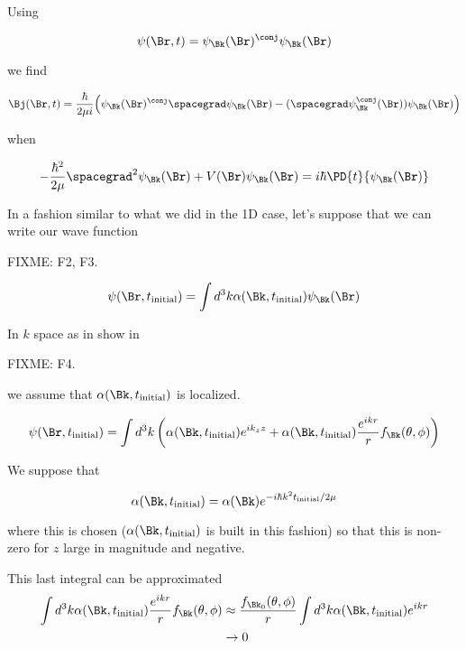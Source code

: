 Using

\begin{equation}\label{eqn:qmTwoL24:n}
\psi(\Br, t) =
\psi_\Bk(\Br)^\conj
\psi_\Bk(\Br)
\end{equation}

we find

\begin{equation}\label{eqn:qmTwoL24:n}
\Bj(\Br, t) = \frac{\hbar}{2 \mu i} \Bigl(
\psi_\Bk(\Br)^\conj \spacegrad \psi_\Bk(\Br)
- (\spacegrad \psi_\Bk^\conj(\Br)) \psi_\Bk(\Br)
\Bigr)
\end{equation}

when

\begin{equation}\label{eqn:qmTwoL24:n}
-\frac{\hbar^2}{2\mu} \spacegrad^2
\psi_\Bk(\Br)
+ V(\Br)
\psi_\Bk(\Br)
=
i \hbar \PD{t}{
\psi_\Bk(\Br)
}
\end{equation}

In a fashion similar to what we did in the 1D case, let's suppose that we can write our wave function

FIXME: F2, F3.

\begin{equation}\label{eqn:qmTwoL24:n}
\psi(\Br, t_{\text{initial}}) = \int d^3k \alpha(\Bk, t_{\text{initial}}) \psi_\Bk(\Br)
\end{equation}

In $k$ space as in show in

FIXME: F4.

we assume that $\alpha(\Bk, t_{\text{initial}})$ is localized.

\begin{equation}\label{eqn:qmTwoL24:n}
\psi(\Br, t_{\text{initial}}) =
\int d^3k
\left(
\alpha(\Bk, t_{\text{initial}})
e^{i k_z z}
+
\alpha(\Bk, t_{\text{initial}}) \frac{e^{i k r}}{r} f_\Bk(\theta, \phi)
\right)
\end{equation}

We suppose that

\begin{equation}\label{eqn:qmTwoL24:n}
\alpha(\Bk, t_{\text{initial}}) = \alpha(\Bk) e^{-i \hbar k^2 t_{\text{initial}}/ 2\mu}
\end{equation}

where this is chosen ($\alpha(\Bk, t_{\text{initial}})$ is built in this fashion) so that this is non-zero for $z$ large in magnitude and negative.

This last integral can be approximated
\begin{equation}\label{eqn:qmTwoL24:n}
\begin{aligned}
\int d^3k
\alpha(\Bk, t_{\text{initial}}) \frac{e^{i k r}}{r} f_\Bk(\theta, \phi)
&\approx
\frac{f_{\Bk_0}(\theta, \phi)}{r}
\int d^3k
\alpha(\Bk, t_{\text{initial}}) e^{i k r} \\
&\rightarrow 0
\end{aligned}
\end{equation}


